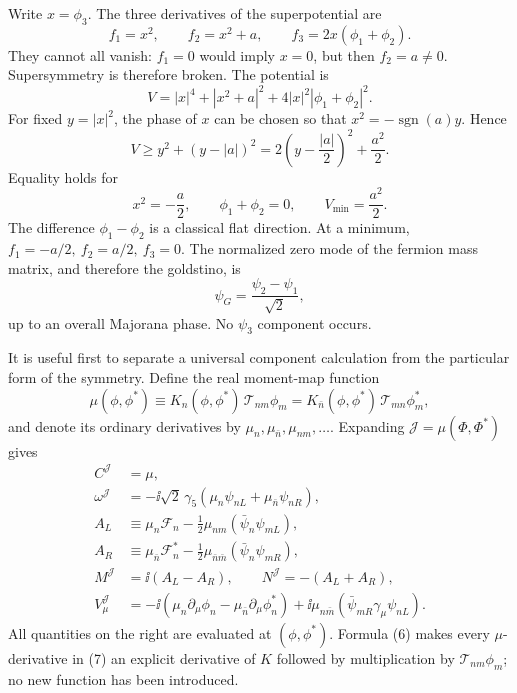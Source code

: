 \begin{enumerate}
  Write \(x=\phi_3\).  The three derivatives of the superpotential are
  \[
    f_1=x^2,\qquad f_2=x^2+a,\qquad
    f_3=2x(\phi_1+\phi_2).
  \]
  They cannot all vanish: \(f_1=0\) would imply \(x=0\), but then
  \(f_2=a\ne0\).  Supersymmetry is therefore broken.  The potential is
  \[
    V=|x|^4+|x^2+a|^2
      +4|x|^2|\phi_1+\phi_2|^2 .
  \]
  For fixed \(y=|x|^2\), the phase of \(x\) can be chosen so that
  \(x^2=-\operatorname{sgn}(a)y\).  Hence
  \[
    V\ge y^2+(y-|a|)^2
      =2\left(y-\frac{|a|}{2}\right)^2+\frac{a^2}{2}.
  \]
  Equality holds for
  \[
    x^2=-\frac a2,\qquad \phi_1+\phi_2=0,
    \qquad V_{\min}=\frac{a^2}{2}.
  \]
  The difference \(\phi_1-\phi_2\) is a classical flat direction.
  At a minimum,
  \(f_1=-a/2,\ f_2=a/2,\ f_3=0\).  The normalized zero mode of the
  fermion mass matrix, and therefore the goldstino, is
  \[
    \psi_G=\frac{\psi_2-\psi_1}{\sqrt2},
  \]
  up to an overall Majorana phase.  No \(\psi_3\) component occurs.

  It is useful first to separate a universal component calculation from the
  particular form of the symmetry.  Define the real moment-map function
  \[
    \mu(\phi,\phi^*)\equiv
      K_n(\phi,\phi^*)\,\mathcal T_{nm}\phi_m
      =K_{\bar n}(\phi,\phi^*)\,\mathcal T_{mn}\phi_m^*,
    \tag{6}
  \]
  and denote its ordinary derivatives by
  \(\mu_n,\mu_{\bar n},\mu_{nm},\ldots\).  Expanding
  \(\mathcal J=\mu(\Phi,\Phi^*)\) gives
  \[
  \begin{aligned}
    C^{\mathcal J}&=\mu,\\
    \omega^{\mathcal J}
      &=-\ii\sqrt2\,\gamma_5
        \left(\mu_n\psi_{nL}+\mu_{\bar n}\psi_{nR}\right),\\
    A_L&\equiv
      \mu_n\mathcal F_n
      -\frac12\mu_{nm}(\bar\psi_n\psi_{mL}),\\
    A_R&\equiv
      \mu_{\bar n}\mathcal F_n^*
      -\frac12\mu_{\bar n\bar m}(\bar\psi_n\psi_{mR}),\\
    M^{\mathcal J}&=\ii(A_L-A_R),\qquad
    N^{\mathcal J}=-(A_L+A_R),\\
    V_\mu^{\mathcal J}
      &=-\ii\left(\mu_n\partial_\mu\phi_n
               -\mu_{\bar n}\partial_\mu\phi_n^*\right)
        +\ii\mu_{n\bar m}
          (\bar\psi_{mR}\gamma_\mu\psi_{nL}).
  \end{aligned}
  \tag{7}
  \]
  All quantities on the right are evaluated at \((\phi,\phi^*)\).
  Formula (6) makes every \(\mu\)-derivative in (7) an explicit derivative
  of \(K\) followed by multiplication by
  \(\mathcal T_{nm}\phi_m\); no new function has been introduced.


\end{enumerate}
